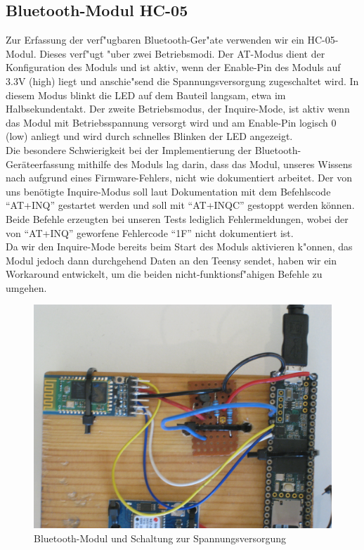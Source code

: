 \documentclass[a4paper,11pt, ngerman]{scrartcl}
\begin{document}
\subsection{Bluetooth-Modul HC-05}
Zur Erfassung der verf"ugbaren Bluetooth-Ger"ate verwenden wir ein HC-05-Modul. Dieses verf"ugt "uber zwei Betriebsmodi. Der AT-Modus dient der Konfiguration des Moduls und ist aktiv, wenn der Enable-Pin des Moduls auf 3.3V (high) liegt und anschie"send die Spannungsversorgung zugeschaltet wird. In diesem Modus blinkt die LED auf dem Bauteil langsam, etwa im Halbsekundentakt. Der zweite Betriebsmodus, der Inquire-Mode, ist aktiv wenn das Modul mit Betriebsspannung versorgt wird und am Enable-Pin logisch 0 (low) anliegt und wird durch schnelles Blinken der LED angezeigt.\\
Die besondere Schwierigkeit bei der Implementierung der Bluetooth-Geräteerfassung mithilfe des Moduls lag darin, dass das Modul, unseres Wissens nach aufgrund eines Firmware-Fehlers, nicht wie dokumentiert arbeitet. Der von uns benötigte Inquire-Modus soll laut Dokumentation mit dem Befehlscode \enquote{AT+INQ} gestartet werden und soll mit \enquote{AT+INQC} gestoppt werden können. Beide Befehle erzeugten bei unseren Tests lediglich Fehlermeldungen, wobei der von \enquote{AT+INQ} geworfene Fehlercode \enquote{1F} nicht dokumentiert ist.\\
Da wir den Inquire-Mode bereits beim Start des Moduls aktivieren k"onnen, das Modul jedoch dann durchgehend Daten an den Teensy sendet, haben wir ein Workaround entwickelt, um die beiden nicht-funktionsf"ahigen Befehle zu umgehen.\\

\begin{figure}[H]
	\includegraphics[width=.95\linewidth]{BT.JPG}\caption{Bluetooth-Modul und Schaltung zur Spannungsversorgung}
\end{figure}
\end{document}
